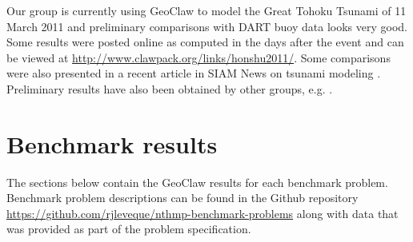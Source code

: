 Our group is currently using GeoClaw to model the Great Tohoku Tsunami of 11
March 2011 and preliminary comparisons with DART buoy data looks very good.
Some results were posted online as computed in the days after the event and
can be viewed at
\url{http://www.clawpack.org/links/honshu2011/}.
Some comparisons were also presented in a recent article in SIAM News on tsunami
modeling \cite{siamnews-tsunami}.  Preliminary results have also been
obtained by other groups, e.g. \cite{ZhangYuenEtal:2011}.


\section{Benchmark results}

The sections below contain the GeoClaw results for each benchmark problem.
Benchmark problem descriptions can be found in the Github repository
\url{https://github.com/rjleveque/nthmp-benchmark-problems}
\cite{bp-description} 
along with data that was provided as part of the problem specification.

